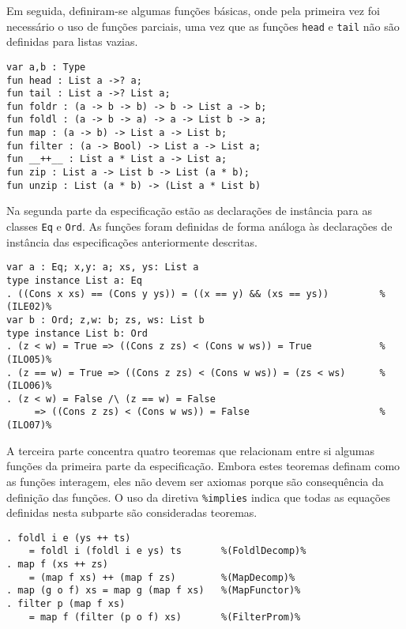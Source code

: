 Em seguida, definiram-se algumas funções básicas, onde pela primeira vez foi necessário o uso de funções parciais, uma vez que as funções \Verb.head. e \Verb.tail. não são definidas para listas vazias.

\begin{Verbatim}
var a,b : Type 
fun head : List a ->? a; 
fun tail : List a ->? List a; 
fun foldr : (a -> b -> b) -> b -> List a -> b; 
fun foldl : (a -> b -> a) -> a -> List b -> a; 
fun map : (a -> b) -> List a -> List b; 
fun filter : (a -> Bool) -> List a -> List a; 
fun __++__ : List a * List a -> List a; 
fun zip : List a -> List b -> List (a * b); 
fun unzip : List (a * b) -> (List a * List b) 
\end{Verbatim}

Na segunda parte da especificação estão as declarações de instância para as classes \Verb.Eq. e \Verb.Ord..
As funções foram definidas de forma análoga às declarações de instância das especificações anteriormente descritas.

\begin{Verbatim}
var a : Eq; x,y: a; xs, ys: List a
type instance List a: Eq
. ((Cons x xs) == (Cons y ys)) = ((x == y) && (xs == ys))         %(ILE02)%
var b : Ord; z,w: b; zs, ws: List b
type instance List b: Ord
. (z < w) = True => ((Cons z zs) < (Cons w ws)) = True            %(ILO05)%
. (z == w) = True => ((Cons z zs) < (Cons w ws)) = (zs < ws)      %(ILO06)%
. (z < w) = False /\ (z == w) = False                             
     => ((Cons z zs) < (Cons w ws)) = False                       %(ILO07)%
\end{Verbatim}

A terceira parte concentra quatro teoremas que relacionam entre si algumas funções da primeira parte da especificação.
Embora estes teoremas definam como as funções interagem, eles não devem ser axiomas porque são consequência da definição das funções.
O uso da diretiva \Verb.%

\begin{Verbatim}
. foldl i e (ys ++ ts) 
	= foldl i (foldl i e ys) ts       %(FoldlDecomp)% 
. map f (xs ++ zs) 
	= (map f xs) ++ (map f zs)        %(MapDecomp)% 
. map (g o f) xs = map g (map f xs)   %(MapFunctor)% 
. filter p (map f xs) 
	= map f (filter (p o f) xs)       %(FilterProm)%
\end{Verbatim}

